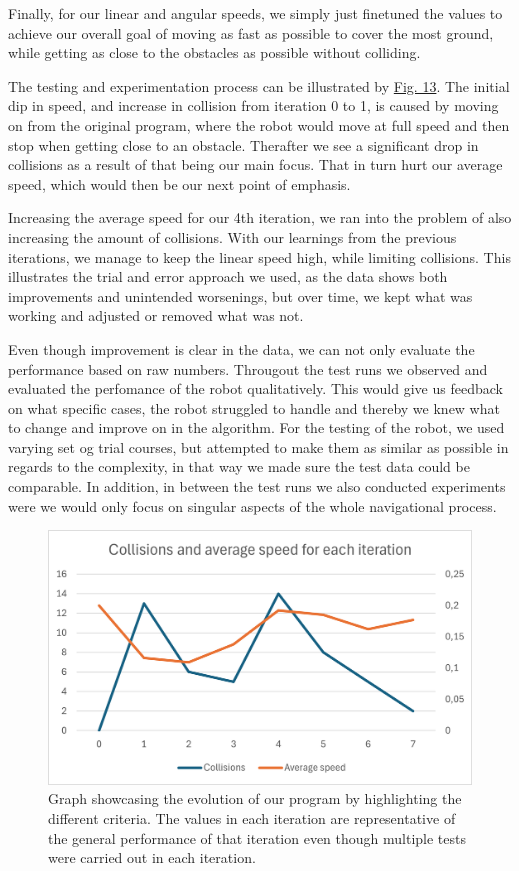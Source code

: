 \documentclass[conference]{IEEEtran}
\begin{document}
Finally, for our linear and angular speeds, we simply just finetuned the values to achieve our overall goal of moving as fast as possible to cover the most ground, while getting as close to the obstacles as possible without colliding.

The testing and experimentation process can be illustrated by \href{sec:graph}{Fig. 13}.
The initial dip in speed, and increase in collision from iteration 0 to 1, is caused by moving on from the original program, where the robot would move at full speed and then stop when getting close to an obstacle.
Therafter we see a significant drop in collisions as a result of that being our main focus.
That in turn hurt our average speed, which would then be our next point of emphasis.

Increasing the average speed for our 4th iteration, we ran into the problem of also increasing the amount of collisions.
With our learnings from the previous iterations, we manage to keep the linear speed high, while limiting collisions.
This illustrates the trial and error approach we used, as the data shows both improvements and unintended worsenings, but over time, we kept what was working and adjusted or removed what was not. 

Even though improvement is clear in the data, we can not only evaluate the performance based on raw numbers. 
Througout the test runs we observed and evaluated the perfomance of the robot qualitatively.
This would give us feedback on what specific cases, the robot struggled to handle and thereby we knew what to change and improve on in the algorithm.
For the testing of the robot, we used varying set og trial courses, but attempted to make them as similar as possible in regards to the complexity, in that way we made sure the test data could be comparable.
In addition, in between the test runs we also conducted experiments were we would only focus on singular aspects of the whole navigational process.
\begin{figure}[htbp]
    \centerline{\includegraphics[width=1.0\columnwidth]{Pictures/Graph.png}}
    \caption{Graph showcasing the evolution of our program by highlighting the different criteria. The values in each iteration are representative of the general performance of that iteration even though multiple tests were carried out in each iteration.}
    \label{sec:graph}
    \end{figure}
\end{document}
